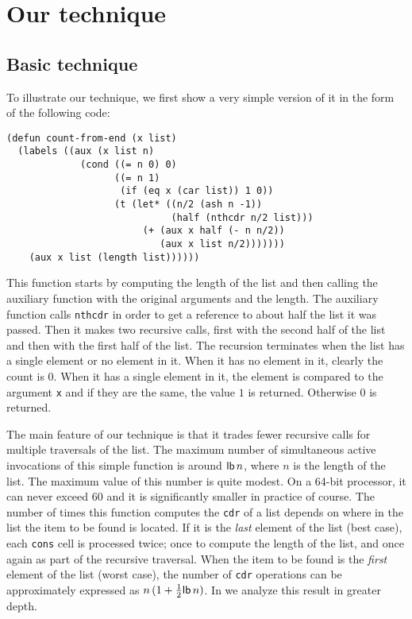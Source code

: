 \section{Our technique}

\subsection{Basic technique}
\label{sec-basic-technique}

To illustrate our technique, we first show a very simple version of it
in the form of the following code:

{\small\begin{verbatim}
(defun count-from-end (x list)
  (labels ((aux (x list n)
             (cond ((= n 0) 0)
                   ((= n 1)
                    (if (eq x (car list)) 1 0))
                   (t (let* ((n/2 (ash n -1))
                             (half (nthcdr n/2 list)))
                        (+ (aux x half (- n n/2))
                           (aux x list n/2)))))))
    (aux x list (length list))))))
\end{verbatim}}

This function starts by computing the length of the list and then
calling the auxiliary function with the original arguments and the
length.  The auxiliary function calls \texttt{nthcdr} in order to get
a reference to about half the list it was passed.  Then it makes two
recursive calls, first with the second half of the list and then with
the first half of the list.  The recursion terminates when the list has
a single element or no element in it.  When it has no element in it,
clearly the count is $0$.  When it has a single element in it, the
element is compared to the argument \texttt{x} and if they are the
same, the value $1$ is returned.  Otherwise $0$ is returned.

The main feature of our technique is that it trades fewer recursive
calls for multiple traversals of the list.  The maximum number of
simultaneous active invocations of this simple function is around
$\mathsf{lb}\thinspace n$, where $n$ is the length of the list.  The
maximum value of this number is quite modest.  On a 64-bit processor,
it can never exceed $60$ and it is significantly smaller in practice
of course.  The number of times this function computes the
\texttt{cdr} of a list depends on where in the list the item to be
found is located.  If it is the \emph{last} element of the list (best
case), each \texttt{cons} cell is processed twice; once to compute the
length of the list, and once again as part of the recursive traversal.
When the item to be found is the \emph{first} element of the list
(worst case), the number of \texttt{cdr} operations can be
approximately expressed as $n\thinspace (1 +
\frac{1}{2}\mathsf{lb}\thinspace n)$.  In  we
analyze this result in greater depth.

